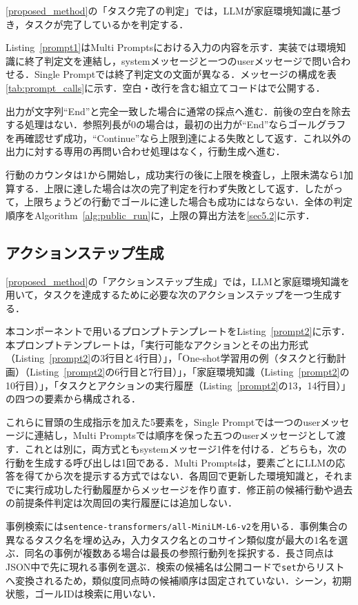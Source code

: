 \ref{proposed_method}の「タスク完了の判定」では，LLMが家庭環境知識に基づき，タスクが完了しているかを判定する．

Listing~\ref{prompt1}はMulti Promptsにおける入力の内容を示す．実装では環境知識に終了判定文を連結し，systemメッセージと一つのuserメッセージで問い合わせる．Single Promptでは終了判定文の文面が異なる．メッセージの構成を表\ref{tab:prompt_calls}に示す．空白・改行を含む組立てコードはで公開する．

出力が文字列``End''と完全一致した場合に通常の採点へ進む．前後の空白を除去する処理はない．参照列長が0の場合は，最初の出力が``End''ならゴールグラフを再確認せず成功，``Continue''なら上限到達による失敗として返す．これ以外の出力に対する専用の再問い合わせ処理はなく，行動生成へ進む．

行動のカウンタは1から開始し，成功実行の後に上限を検査し，上限未満なら1加算する．上限に達した場合は次の完了判定を行わず失敗として返す．したがって，上限ちょうどの行動でゴールに達した場合も成功にはならない．全体の判定順序をAlgorithm~\ref{alg:public_run}に，上限の算出方法を\ref{sec5.2}に示す．


\subsection{アクションステップ生成} \label{sec4.3}

\ref{proposed_method}の「アクションステップ生成」では，LLMと家庭環境知識を用いて，タスクを達成するために必要な次のアクションステップを一つ生成する．

本コンポーネントで用いるプロンプトテンプレートをListing~\ref{prompt2}に示す．本プロンプトテンプレートは，「実行可能なアクションとその出力形式（Listing~\ref{prompt2}の3行目と4行目）」，「One-shot学習用の例（タスクと行動計画）（Listing~\ref{prompt2}の6行目と7行目）」，「家庭環境知識（Listing~\ref{prompt2}の10行目）」，「タスクとアクションの実行履歴（Listing~\ref{prompt2}の13，14行目）」の四つの要素から構成される．

これらに冒頭の生成指示を加えた5要素を，Single Promptでは一つのuserメッセージに連結し，Multi Promptsでは順序を保った五つのuserメッセージとして渡す．これとは別に，両方式ともsystemメッセージ1件を付ける．どちらも，次の行動を生成する呼び出しは1回である．Multi Promptsは，要素ごとにLLMの応答を得てから次を提示する方式ではない．各周回で更新した環境知識と，それまでに実行成功した行動履歴からメッセージを作り直す．修正前の候補行動や過去の前提条件判定は次周回の実行履歴には追加しない．

事例検索には\texttt{sentence-transformers/all-MiniLM-L6-v2}を用いる．事例集合の異なるタスク名を埋め込み，入力タスク名とのコサイン類似度が最大の1名を選ぶ．同名の事例が複数ある場合は最長の参照行動列を採択する．長さ同点はJSON中で先に現れる事例を選ぶ．検索の候補名は公開コードで\texttt{set}からリストへ変換されるため，類似度同点時の候補順序は固定されていない．シーン，初期状態，ゴールIDは検索に用いない．

